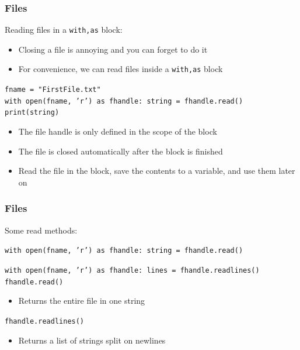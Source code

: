 \documentclass{beamer}
\newcommand{\code}[1]{\texttt{#1}}
\newcommand{\tab}{\hspace*{22pt}}
\begin{document}
\begin{frame}	
	\frametitle{Files}
	
	\begin{block}{Reading files in a \code{with,as} block:}
			\begin{itemize}
				\item Closing a file is annoying and you can forget to do it
				\item For convenience, we can read files inside a \code{with,as} block
			\end{itemize}
			
			\vspace{20pt}
			\code{fname = "FirstFile.txt" \\
					with open(fname, 'r') as fhandle:
					\tab string = fhandle.read() \\
					\tab print(string)
			}
		\endminipage\hfill
			\begin{itemize}
				\item The file handle is only defined in the scope of the block
				\item The file is closed automatically after the block is finished
				\item Read the file in the block, save the contents to a variable, and use them later on
			\end{itemize}
		\endminipage\hfill
	\end{block}
	
\end{frame}

\begin{frame}	
	\frametitle{Files}
	
	\begin{block}{Some read methods:}
			\vspace{10pt}
			
			\code{with open(fname, 'r') as fhandle:
					\tab string = fhandle.read() \\
			}
			
			\vspace{10pt}
			\code{with open(fname, 'r') as fhandle:
					\tab lines = fhandle.readlines() \\
			}
		\endminipage\hfill
		\endminipage\hfill
			\code{fhandle.read()}
			\begin{itemize}
				\item Returns the entire file in one string
			\end{itemize}
			
			\vspace{10pt}
			\code{fhandle.readlines()}
			\begin{itemize}
				\item Returns a list of strings split on newlines
			\end{itemize}
		\endminipage\hfill
	\end{block}
	
\end{frame}
\end{document}
